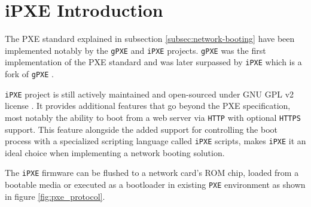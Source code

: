\documentclass[../main.tex]{subfiles}
\begin{document}
\section{iPXE Introduction}
\label{sec:ipxe-introduction}

The PXE standard explained in subsection \ref{subsec:network-booting} have been implemented notably
by the \texttt{gPXE} and \texttt{iPXE} projects. \texttt{gPXE} was the first implementation of the PXE standard
and was later surpassed by \texttt{iPXE} which is a fork of \texttt{gPXE} \cite{ipxe_vs_gpxe}.

\texttt{iPXE} project is still actively maintained and open-sourced under GNU GPL v2 license \cite{ipxe_license}.
It provides additional features that go beyond the PXE specification, most notably the ability to boot from
a web server via \texttt{HTTP} with optional \texttt{HTTPS} support. This feature alongside the added support
for controlling the boot process with a specialized scripting language called \texttt{iPXE} scripts, makes
\texttt{iPXE} it an ideal choice when implementing a network booting solution.

The \texttt{iPXE} firmware can be flushed to a network card's ROM chip, loaded from a bootable media
or executed as a bootloader in existing \texttt{PXE} environment as shown in figure \ref{fig:pxe_protocol}.
\end{document}
